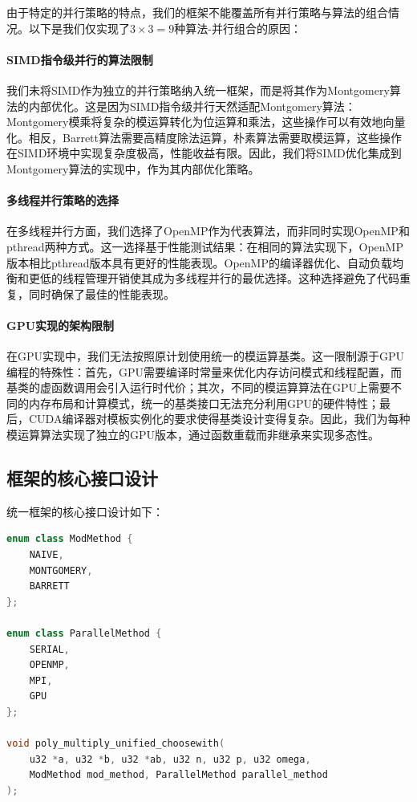 \documentclass[a4paper]{article}
\begin{document}
由于特定的并行策略的特点，我们的框架不能覆盖所有并行策略与算法的组合情况。以下是我们仅实现了$3 \times 3 = 9$种算法-并行组合的原因：

\paragraph{SIMD指令级并行的算法限制} 我们未将SIMD作为独立的并行策略纳入统一框架，而是将其作为Montgomery算法的内部优化。这是因为SIMD指令级并行天然适配Montgomery算法：Montgomery模乘将复杂的模运算转化为位运算和乘法，这些操作可以有效地向量化。相反，Barrett算法需要高精度除法运算，朴素算法需要取模运算，这些操作在SIMD环境中实现复杂度极高，性能收益有限。因此，我们将SIMD优化集成到Montgomery算法的实现中，作为其内部优化策略。

\paragraph{多线程并行策略的选择} 在多线程并行方面，我们选择了OpenMP作为代表算法，而非同时实现OpenMP和pthread两种方式。这一选择基于性能测试结果：在相同的算法实现下，OpenMP版本相比pthread版本具有更好的性能表现。OpenMP的编译器优化、自动负载均衡和更低的线程管理开销使其成为多线程并行的最优选择。这种选择避免了代码重复，同时确保了最佳的性能表现。

\paragraph{GPU实现的架构限制} 在GPU实现中，我们无法按照原计划使用统一的模运算基类。这一限制源于GPU编程的特殊性：首先，GPU需要编译时常量来优化内存访问模式和线程配置，而基类的虚函数调用会引入运行时代价；其次，不同的模运算算法在GPU上需要不同的内存布局和计算模式，统一的基类接口无法充分利用GPU的硬件特性；最后，CUDA编译器对模板实例化的要求使得基类设计变得复杂。因此，我们为每种模运算算法实现了独立的GPU版本，通过函数重载而非继承来实现多态性。

\subsection{框架的核心接口设计}

统一框架的核心接口设计如下：

\begin{lstlisting}[language=C++]
enum class ModMethod {
    NAIVE,
    MONTGOMERY, 
    BARRETT
};

enum class ParallelMethod {
    SERIAL,
    OPENMP,
    MPI,
    GPU
};

void poly_multiply_unified_choosewith(
    u32 *a, u32 *b, u32 *ab, u32 n, u32 p, u32 omega,
    ModMethod mod_method, ParallelMethod parallel_method
);
\end{lstlisting}
\end{document}
